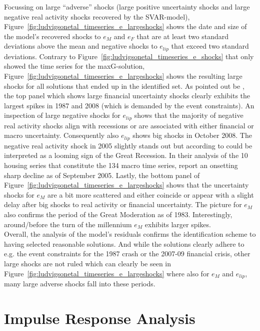 \documentclass[a4paper,11pt,listof=nochaptergap,oneside,pointednumbers,bibtotoc,bigheadings,liststotoc,hidelinks]{scrbook}
\theoremstyle{mysatz}
\theoremstyle{mydefinition}
\theoremstyle{mytheorem}
\theoremstyle{mybemerkung}
\begin{document}
Focussing on large ``adverse'' shocks (large positive uncertainty shocks and large negative real activity shocks recovered by the SVAR-model), Figure~\ref{fig:ludvigsonetal_timeseries_e_largeshocks} shows the date and size of the model's recovered shocks to $e_M$ and $e_F$ that are at least two standard deviations above the mean and negative shocks to $e_{lip}$ that exceed two standard deviations. Contrary to Figure~\ref{fig:ludvigsonetal_timeseries_e_shocks} that only showed the time series for the maxG-solution, Figure~\ref{fig:ludvigsonetal_timeseries_e_largeshocks} shows the resulting large shocks for all solutions that ended up in the identified set. As pointed out be \citet{ludvigsonetal:19}, the top panel which shows large financial uncertainty shocks clearly exhibits the largest spikes in 1987 and 2008 (which is demanded by the event constraints). An inspection of large negative shocks for $e_{lip}$ shows that the majority of negative real activity shocks align with recessions or are associated with either financial or macro uncertainty. Consequently also $e_{lip}$ shows big shocks in October 2008. The negative real activity shock in 2005 slightly stands out but according to \citet{ludvigsonetal:19} could be interpreted as a looming sign of the Great Recession. In their analysis of the 10 housing series that constitute the 134 macro time series, \citet{ludvigsonetal:19} report an onsetting sharp decline as of September 2005. Lastly, the bottom panel of Figure~\ref{fig:ludvigsonetal_timeseries_e_largeshocks} shows that the uncertainty shocks for $e_M$ are a bit more scattered and either coincide or appear with a slight delay after big shocks to real activity or financial uncertainty. The picture for $e_M$ also confirms the period of the Great Moderation as of 1983. Interestingly, around/before the turn of the millennium $e_M$ exhibits larger spikes.\\

Overall, the analysis of the model's residuals confirms the identification scheme to having selected reasonable solutions. And while the solutions clearly adhere to e.g. the event constraints for the 1987 crash or the 2007-09 financial crisis, other large shocks are not ruled which can clearly be seen in Figure~\ref{fig:ludvigsonetal_timeseries_e_largeshocks} where also for $e_M$ and $e_{lip}$, many large adverse shocks fall into these periods.





\section[Impulse Response Analysis]{Impulse Response Analysis}
\label{sec:ImpulseResponseAnalysis}
\end{document}
